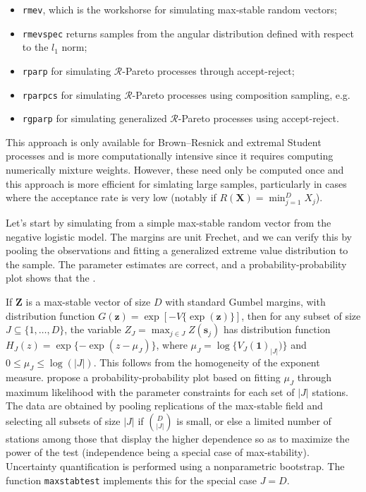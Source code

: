 \documentclass[]{book}
\providecommand{\tightlist}{%
  \setlength{\itemsep}{0pt}\setlength{\parskip}{0pt}}
\begin{document}
\begin{itemize}
\tightlist
\item
  \texttt{rmev}, which is the workshorse for simulating max-stable random vectors;
\item
  \texttt{rmevspec} returns samples from the angular distribution defined with respect to the \(l_1\) norm;
\item
  \texttt{rparp} for simulating \(\mathcal{R}\)-Pareto processes through accept-reject;
\item
  \texttt{rparpcs} for simulating \(\mathcal{R}\)-Pareto processes using composition sampling, e.g.~\citet{Ho/Dombry:2019}
\item
  \texttt{rgparp} for simulating generalized \(\mathcal{R}\)-Pareto processes using accept-reject.
\end{itemize}

This approach is only available for Brown--Resnick and extremal Student processes and is more computationally intensive since it requires computing numerically mixture weights. However, these need only be computed once and this approach is more efficient for simlating large samples, particularly in cases where the acceptance rate is very low (notably if \(R(\boldsymbol{X})=\min_{j=1}^DX_j\)).

Let's start by simulating from a simple max-stable random vector from the negative logistic model. The margins are unit Frechet, and we can verify this by pooling the observations and fitting a generalized extreme value distribution to the sample. The parameter estimates are correct, and a probability-probability plot shows that the .

If \(\boldsymbol{Z}\) is a max-stable vector of size \(D\) with standard Gumbel margins, with distribution function \(G(\boldsymbol{z}) = \exp[-V\{\exp(\boldsymbol{z})\}]\), then for any subset of size \(J \subseteq\{1, \ldots, D\}\), the variable \(Z_J=\max_{j \in J} Z(\boldsymbol{s}_j)\) has distribution function \(H_J(z) = \exp\{-\exp(z-\mu_{J})\}\), where \(\mu_J=\log\{V_J(\boldsymbol{1})_{|J|})\}\) and \(0 \leq \mu_J \leq \log(|J|)\). This follows from the homogeneity of the exponent measure. \citet{Gabda:2012} propose a probability-probability plot based on fitting \(\mu_J\) through maximum likelihood with the parameter constraints for each set of \(|J|\) stations. The data are obtained by pooling replications of the max-stable field and selecting all subsets of size \(|J|\) if \(\binom{D}{|J|}\) is small, or else a limited number of stations among those that display the higher dependence so as to maximize the power of the test (independence being a special case of max-stability). Uncertainty quantification is performed using a nonparametric bootstrap. The function \texttt{maxstabtest} implements this for the special case \(J=D\).
\end{document}
